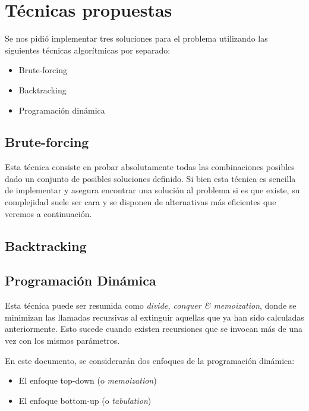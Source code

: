 \section{Técnicas propuestas}
Se nos pidió implementar tres soluciones para el problema utilizando las siguientes técnicas algorítmicas por separado:
\begin{itemize}
	\item Brute-forcing
	\item Backtracking
	\item Programación dinámica
\end{itemize}

\subsection{Brute-forcing}
Esta técnica consiste en probar absolutamente todas las combinaciones posibles dado un conjunto de posibles soluciones definido. Si bien esta técnica es sencilla de implementar y asegura encontrar una solución al problema si es que existe, su complejidad suele ser cara y se disponen de alternativas más eficientes que veremos a continuación.

\subsection{Backtracking}

\subsection{Programación Dinámica}
Esta técnica puede ser resumida como \textit{divide, conquer \& memoization}, donde se minimizan las llamadas recursivas al extinguir aquellas que ya han sido calculadas anteriormente. Esto sucede cuando existen recursiones que se invocan más de una vez con los mismos parámetros.

\vskip 8pt

En este documento, se considerarán dos enfoques de la programación dinámica:
\begin{itemize}
	\item El enfoque top-down (o \textit{memoization})
	\item El enfoque bottom-up (o \textit{tabulation})
\end{itemize}
